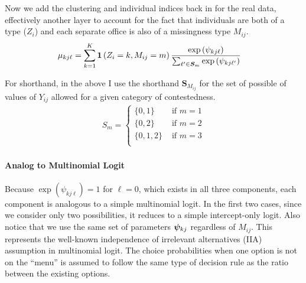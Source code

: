 \documentclass[11pt]{article}
\begin{document}
Now we add the clustering and individual indices back in for the real data, effectively another layer to account for the fact that individuals are both of a type (\(Z_i\)) and each separate office is also of a missingness type \(M_{ij}\). 
\begin{align}
\mu_{kj\ell} &= \sum^K_{k=1}\bm{1}\left(Z_i = k, M_{ij}= m\right)\frac{\exp{(\psi_{kj\ell})}}{\sum_{\ell^\prime \in \bm{S}_{m}}\exp{(\psi_{kj\ell^\prime})}}\label{eq:missing}
\end{align}

For shorthand, in the above I use the shorthand \(\bm{S}_{M_{ij}}\) for the set of possible of values of \(Y_{ij}\) allowed for a given category of contestedness.
\begin{align*}
S_{m} = \begin{cases}
\{0, 1\} & \text{~if~} m = 1\\
\{0, 2\}  & \text{~if~} m = 2\\
\{0, 1, 2\} & \text{~if~} m = 3\\
\end{cases}
\end{align*}





\paragraph{Analog to Multinomial Logit} Because \(\exp(\psi_{kj\ell}) = 1\) for \(\ell = 0\), which exists in all three components, each component is analogous to a simple multinomial logit. In the first two cases, since we consider only two possibilities, it reduces to a simple intercept-only logit. Also notice that we use the same set of parameters \(\bm{\psi}_{kj}\) regardless of \(M_{ij}\). This represents the well-known independence of irrelevant alternatives (IIA) assumption in multinomial logit. The choice probabilities when one option is not on the ``menu'' is assumed to follow the same type of decision rule as the ratio between the existing options.  
\end{document}
